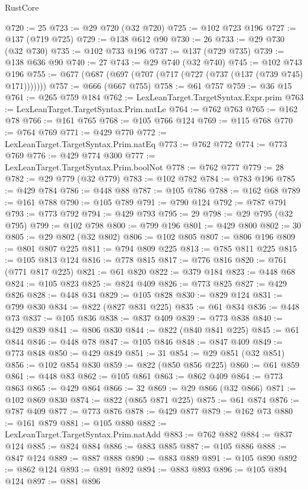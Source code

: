 \begin{lexlean}{RustCore}
\begin{coremodule}
{\begin{coremodule}
{{{{{{{{{{{{{{{{{{{{{{{{{{{{{{{{{{{{{{{{{{{{{@720 := 25
@723 := @29 @720 (@32 @720)
@725 := @102 @723 @196
@727 := @137 (@719 @725)
@729 := @138 @612 @90
@730 := 26
@733 := @29 @730 (@32 @730)
@735 := @102 @733 @196
@737 := @137 (@729 @735)
@739 := @138 @636 @90
@740 := 27
@743 := @29 @740 (@32 @740)
@745 := @102 @743 @196
@755 := @677 (@687 (@697 (@707 (@717 (@727 (@737 (@137 (@739 @745) @171)))))))
@757 := @666 (@667 @755)
@758 := @61 @757
@759 := @36 @15
@761 := @265 @759 @184
@762 := LexLeanTarget.TargetSyntax.Expr.prim
@763 := LexLeanTarget.TargetSyntax.Prim.natLe
@764 := @762 @763
@765 := @162 @78
@766 := @161 @765
@768 := @105 @766 @124
@769 := @115 @768
@770 := @764 @769
@771 := @429 @770
@772 := LexLeanTarget.TargetSyntax.Prim.natEq
@773 := @762 @772
@774 := @773 @769
@776 := @429 @774 @300
@777 := LexLeanTarget.TargetSyntax.Prim.boolNot
@778 := @762 @777
@779 := 28
@782 := @29 @779 (@32 @779)
@783 := @102 @782
@784 := @783 @196
@785 := @429 @784
@786 := @448 @88
@787 := @105 @786
@788 := @162 @68
@789 := @161 @788
@790 := @105 @789
@791 := @790 @124
@792 := @787 @791
@793 := @773 @792
@794 := @429 @793
@795 := 29
@798 := @29 @795 (@32 @795)
@799 := @102 @798
@800 := @799 @196
@801 := @429 @800
@802 := 30
@805 := @29 @802 (@32 @802)
@806 := @102 @805
@807 := @806 @196
@809 := @801 @807 @225
@811 := @794 @809 @225
@813 := @785 @811 @225
@815 := @105 @813 @124
@816 := @778 @815
@817 := @776 @816
@820 := @761 (@771 @817 @225)
@821 := @61 @820
@822 := @379 @184
@823 := @448 @68
@824 := @105 @823
@825 := @824 @409
@826 := @773 @825
@827 := @429 @826
@828 := @448 @34
@829 := @105 @828
@830 := @829 @124
@831 := @799 @830
@834 := @822 (@827 @831 @225)
@835 := @61 @834
@836 := @448 @73
@837 := @105 @836
@838 := @837 @409
@839 := @773 @838
@840 := @429 @839
@841 := @806 @830
@844 := @822 (@840 @841 @225)
@845 := @61 @844
@846 := @448 @78
@847 := @105 @846
@848 := @847 @409
@849 := @773 @848
@850 := @429 @849
@851 := 31
@854 := @29 @851 (@32 @851)
@856 := @102 @854 @830
@859 := @822 (@850 @856 @225)
@860 := @61 @859
@861 := @448 @83
@862 := @105 @861
@863 := @862 @409
@864 := @773 @863
@865 := @429 @864
@866 := 32
@869 := @29 @866 (@32 @866)
@871 := @102 @869 @830
@874 := @822 (@865 @871 @225)
@875 := @61 @874
@876 := @787 @409
@877 := @773 @876
@878 := @429 @877
@879 := @162 @73
@880 := @161 @879
@881 := @105 @880
@882 := LexLeanTarget.TargetSyntax.Prim.natAdd
@883 := @762 @882
@884 := @837 @124
@885 := @824 @884
@886 := @883 @885
@887 := @105 @886
@888 := @847 @124
@889 := @887 @888
@890 := @883 @889
@891 := @105 @890
@892 := @862 @124
@893 := @891 @892
@894 := @883 @893
@896 := @105 @894 @124
@897 := @881 @896
}}}}}}}}}}}}}}}}}}}}}}}}}}}}}}}}}}}}}}}}}}}}}
\end{coremodule}}
\end{coremodule}
\end{lexlean}

